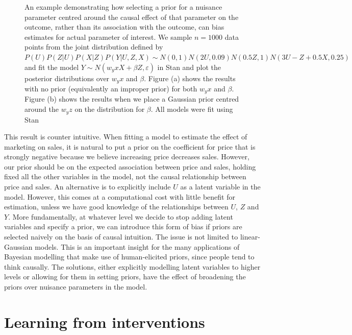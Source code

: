 \documentclass[11pt,a4paper,twoside]{report}
\theoremstyle{plain}
\theoremstyle{definition}
\let\epsilon\varepsilon
\begin{document}
\begin{figure}[ht]
\begin{subfigure}[t]{0.99\textwidth}
\end{subfigure}
\caption{An example demonstrating how selecting a prior for a nuisance parameter centred around the causal effect of that parameter on the outcome, rather than its association with the outcome, can bias estimates for actual parameter of interest. We sample $n=1000$ data points from the joint distribution defined by $P(U)P(Z|U)P(X|Z)P(Y|U,Z,X) \sim N(0,1)N(2U,0.09)N(0.5Z,1)N(3U -Z + 0.5X , 0.25)$ and fit the model $Y \sim N(w_yx X+\beta Z,\epsilon)$ in Stan and plot the posterior distributions over $w_yx$ and $\beta$. Figure (a) shows the results with no prior (equivalently an improper prior) for both $w_yx$ and $\beta$. Figure (b) shows the results when we place a Gaussian prior centred around the $w_yz$ on the distribution for $\beta$. All models were fit using Stan \citep{carpenter2016stan}}\label{fig:careful-prior-example}
\end{figure}

This result is counter intuitive. When fitting a model to estimate the effect of marketing on sales, it is natural to put a prior on the coefficient for price that is strongly negative because we believe increasing price decreases sales. However, our prior should be on the expected association between price and sales, holding fixed all the other variables in the model, not the causal relationship between price and sales. An alternative is to explicitly include $U$ as a latent variable in the model. However, this comes at a computational cost with little benefit for estimation, unless we have good knowledge of the relationships between $U$, $Z$ and $Y$. More fundamentally, at whatever level we decide to stop adding latent variables and specify a prior, we can introduce this form of bias if priors are selected naively on the basis of causal intuition. The issue is not limited to linear-Gaussian models. This is an important insight for the many applications of Bayesian modelling that make use of human-elicited priors, since people tend to think causally. The solutions, either explicitly modelling latent variables to higher levels or allowing for them in setting priors, have the effect of broadening the priors over nuisance parameters in the model. 


\chapter{Learning from interventions}
\label{chap:interventionalist_view}
\end{document}
